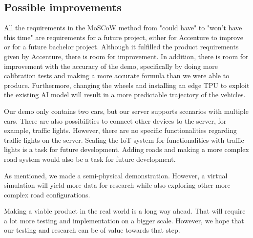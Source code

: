 \subsection{Possible improvements}
All the requirements in the MoSCoW method from "could have" to "won't have this time" are requirements for a future project, either for Accenture to improve or for a future bachelor project. Although it fulfilled the product requirements given by Accenture, there is room for improvement. In addition, there is room for improvement with the accuracy of the demo, specifically by doing more calibration tests and making a more accurate formula than we were able to produce. Furthermore, changing the wheels and installing an edge TPU to exploit the existing AI model will result in a more predictable trajectory of the vehicles.

Our demo only contains two cars, but our server supports scenarios with multiple cars. There are also possibilities to connect other devices to the server, for example, traffic lights. However, there are no specific functionalities regarding traffic lights on the server. Scaling the IoT system for functionalities with traffic lights is a task for future development. Adding roads and making a more complex road system would also be a task for future development.

As mentioned, we made a semi-physical demonstration. However, a virtual simulation will yield more data for research while also exploring other more complex road configurations.

Making a viable product in the real world is a long way ahead. That will require a lot more testing and implementation on a bigger scale. However, we hope that our testing and research can be of value towards that step.